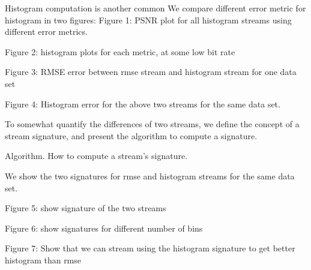 Histogram computation is another common 
We compare different error metric for histogram in two figures:
Figure 1: PSNR plot for all histogram streams using different error metrics.

Figure 2: histogram plots for each metric, at some low bit rate

Figure 3: RMSE error between rmse stream and histogram stream for one data set

Figure 4: Histogram error for the  above two streams for the same data set.

To somewhat quantify the differences of two streams, we define the concept of a stream signature, and present the algorithm to compute a signature.

Algorithm. How to compute a stream's signature.

We show the two signatures for rmse and histogram streams for the same data set.

Figure 5: show signature of the two streams

Figure 6: show signatures for different number of bins

Figure 7: Show that we can stream using the histogram signature to get better histogram than rmse